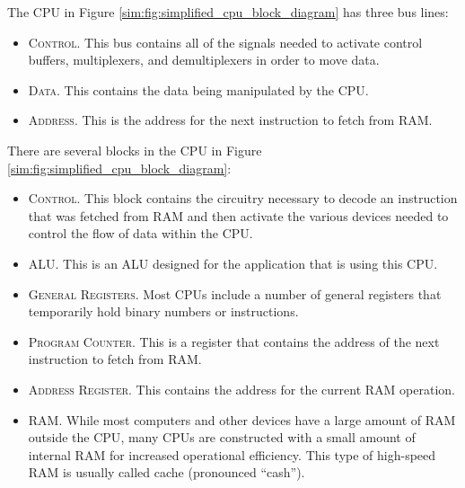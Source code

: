 \begin{figure}[H]
\end{figure}

The \ac{CPU} in Figure \ref{sim:fig:simplified_cpu_block_diagram} has three bus lines: 

\begin{itemize}
  \item \textsc{Control}. This bus contains all of the signals needed to activate control buffers, multiplexers, and demultiplexers in order to move data.
  \item \textsc{Data}. This contains the data being manipulated by the \ac{CPU}.
  \item \textsc{Address}. This is the address for the next instruction to fetch from \ac{RAM}.
\end{itemize}

There are several blocks in the \ac{CPU} in Figure \ref{sim:fig:simplified_cpu_block_diagram}:

\begin{itemize}
  \item \textsc{Control}. This block contains the circuitry necessary to decode an instruction that was fetched from \ac{RAM} and then activate the various devices needed to control the flow of data within the \ac{CPU}.
  \item \textsc{\ac{ALU}}. This is an \acl{ALU} designed for the application that is using this \ac{CPU}.
  \item \textsc{General Registers}. Most \acp{CPU} include a number of general registers that temporarily hold binary numbers or instructions.
  \item \textsc{Program Counter}. This is a register that contains the address of the next instruction to fetch from \ac{RAM}.
  \item \textsc{Address Register}. This contains the address for the current \ac{RAM} operation.
  \item \textsc{\ac{RAM}}. While most computers and other devices have a large amount of \ac{RAM} outside the \ac{CPU}, many \acp{CPU} are constructed with a small amount of internal \ac{RAM} for increased operational efficiency. This type of high-speed \ac{RAM} is usually called cache (pronounced ``cash'').
\end{itemize}


